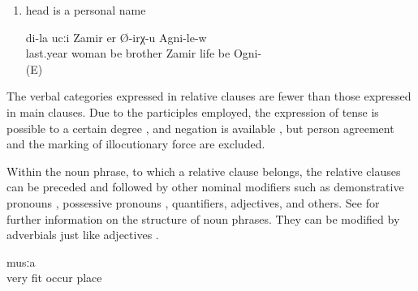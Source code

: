 \begin{enumerate}
	\item	head is a personal name
	\begin{exe}
		\ex	\label{ex:My brother Zamir, who married last year, lives in Ogni}
			di-la	ucːi	Zamir	er	Ø-irχ-u	Agni-le-w\\
			last.year	woman	be		brother	Zamir	life	be	Ogni-\\
		\glt	{} (E)
	\end{exe}
\end{enumerate}

The verbal categories expressed in relative clauses are fewer than those expressed in main clauses. Due to the participles employed, the expression of tense is possible to a certain degree ,  and negation is available , but person agreement and the marking of illocutionary force are excluded. 

Within the noun phrase, to which a relative clause belongs, the relative clauses can be preceded and followed by other nominal modifiers such as demonstrative pronouns , possessive pronouns , quantifiers, adjectives, and others. See  for further information on the structure of noun phrases. They can be modified by adverbials just like adjectives .
%
\begin{exe}
	\ex	\label{ex:‎a very fitting (= good) place}
	\gll	[c'aq'-le	b-al	b-ič-ib]	musːa	\\
		very	fit	occur	place\\
	\glt	\sqt{‎a very fitting (= good) place}
\end{exe}

